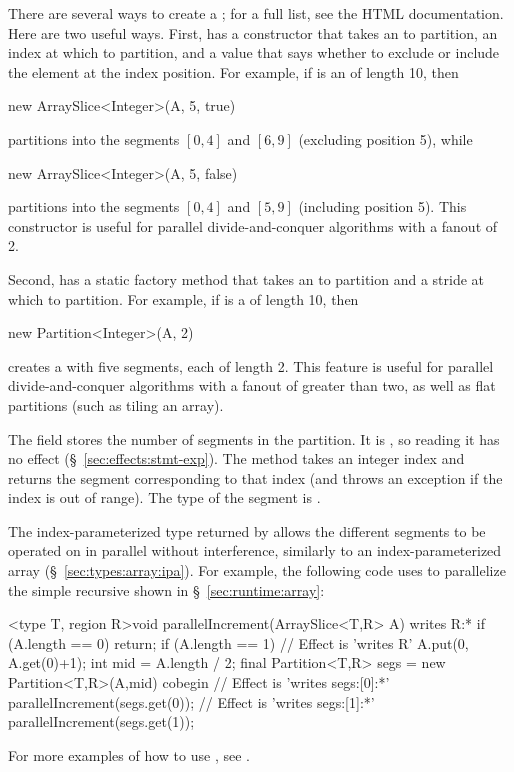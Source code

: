  There are several ways to
create a ; for a full list, see the HTML
documentation.  Here are two useful ways.  First, 
has a constructor that takes an  to partition, an index
at which to partition, and a  value that says whether to
exclude or include the element at the index position.  For example, if
 is an  of length 10, then
%
\begin{dpjlisting}
new ArraySlice<Integer>(A, 5, true)
\end{dpjlisting}
%
partitions  into the segments $[0,4]$ and $[6,9]$ (excluding
position 5), while
%
\begin{dpjlisting}
new ArraySlice<Integer>(A, 5, false)
\end{dpjlisting}
%
partitions  into the segments $[0,4]$ and $[5,9]$ (including
position 5).  This constructor is useful for parallel
divide-and-conquer algorithms with a fanout of 2.

Second,  has a static factory method
 that takes an  to partition and a
stride at which to partition.  For example, if  is a
 of length 10, then
%
\begin{dpjlisting}
new Partition<Integer>(A, 2)
\end{dpjlisting}
%
creates a  with five segments, each of
length 2.  This feature is useful for parallel divide-and-conquer
algorithms with a fanout of greater than two, as well as flat
partitions (such as tiling an array).

 The field  stores the number
of segments in the partition.  It is , so reading it has no
effect (\S~\ref{sec:effects:stmt-exp}).  The method  takes an
integer index  and returns the segment corresponding to that
index (and throws an exception if the index is out of range).  The
type of the segment is .

The index-parameterized type returned by  allows the
different segments to be operated on in parallel without interference,
similarly to an index-parameterized array
(\S~\ref{sec:types:array:ipa}).  For example, the following code uses
 to parallelize the simple recursive 
shown in \S~\ref{sec:runtime:array}:
%
\begin{dpjlisting}
<type T, region R>void parallelIncrement(ArraySlice<T,R> A) 
  writes R:* {
    if (A.length == 0) return;
    if (A.length == 1) {
        // Effect is 'writes R'
        A.put(0, A.get(0)+1);
    }
    int mid = A.length / 2;
    final Partition<T,R> segs = new Partition<T,R>(A,mid)
    cobegin {
        // Effect is 'writes segs:[0]:*'
        parallelIncrement(segs.get(0));
        // Effect is 'writes segs:[1]:*'
        parallelIncrement(segs.get(1));
    }
}
\end{dpjlisting}
%
For more examples of how to use , see \tutorial.

